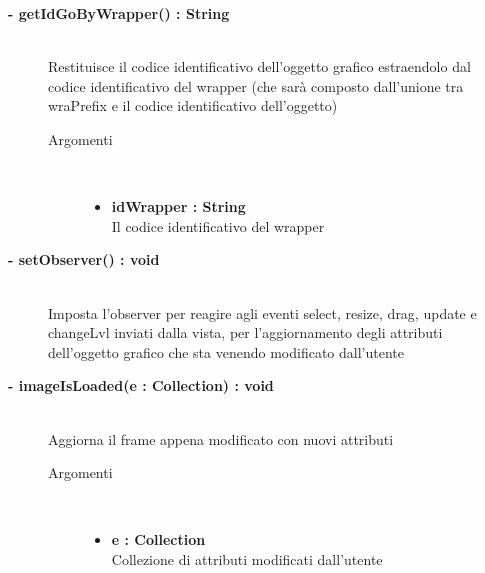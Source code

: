 \begin{description}
	\begin{description}
		\item[\textbf{\color{blue}- getIdGoByWrapper() : String			}] \hfill \\
			Restituisce il codice identificativo dell'oggetto grafico estraendolo dal codice identificativo del wrapper (che sarà composto dall'unione tra wraPrefix e il codice identificativo dell'oggetto)
			
		\begin{description}
			\item[Argomenti] \hfill \\
				\begin{itemize}
				
					\item \textbf{idWrapper : String		} \hfill \\
					Il codice identificativo del wrapper
					
				\end{itemize}
				
		\end{description}
	\end{description}
	
	\begin{description}
		\item[\textbf{\color{blue}- setObserver() : void		}] \hfill \\
			Imposta l'observer per reagire agli eventi select, resize, drag, update e changeLvl inviati dalla vista, per l'aggiornamento degli attributi dell'oggetto grafico che sta venendo modificato dall'utente 
		
	\end{description}
	
	\begin{description}
		\item[\textbf{\color{blue}- imageIsLoaded(e : Collection) : void			}] \hfill \\
			Aggiorna il frame appena modificato con nuovi attributi
			
		\begin{description}
			\item[Argomenti] \hfill \\
				\begin{itemize}
				
					\item \textbf{e : Collection		} \hfill \\
					Collezione di attributi modificati dall'utente
					

\end{itemize}
\end{description}
\end{description}
\end{description}

